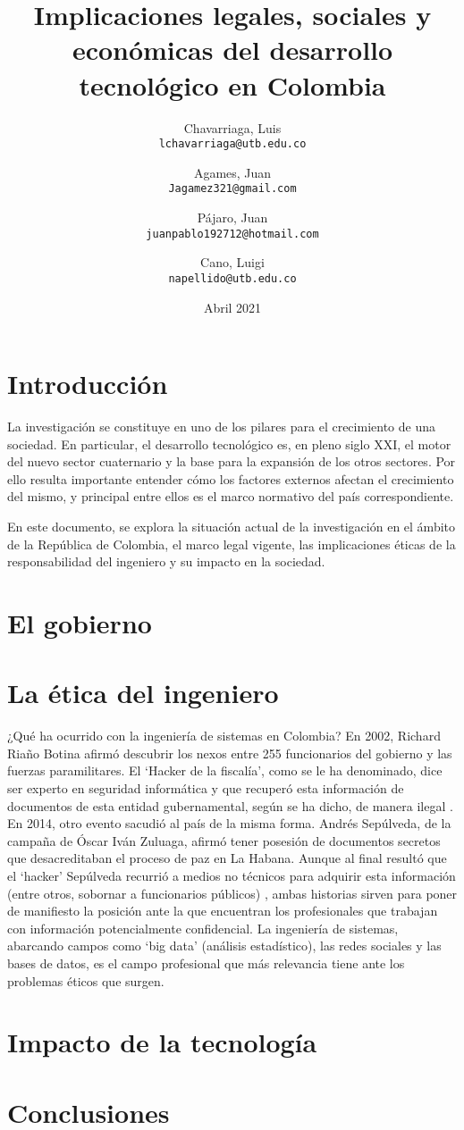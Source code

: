 \documentclass[twocolumn]{article}
\author{
  Chavarriaga, Luis\\
  \texttt{lchavarriaga@utb.edu.co}
  \and
  Agames, Juan\\
  \texttt{Jagamez321@gmail.com}
  \and
  Pájaro, Juan\\
  \texttt{juanpablo192712@hotmail.com}
  \and
  Cano, Luigi\\
  \texttt{napellido@utb.edu.co}
}
\title{Implicaciones legales, sociales y económicas del desarrollo tecnológico
  en Colombia}
\date{Abril 2021}
\begin{document}
\maketitle

\section{Introducción}
La investigación se constituye en uno de los pilares para el crecimiento de una
sociedad. En particular, el desarrollo tecnológico es, en pleno siglo XXI, el
motor del nuevo sector cuaternario y la base para la expansión de los otros
sectores. Por ello resulta importante entender cómo los factores externos
afectan el crecimiento del mismo, y principal entre ellos es el marco normativo
del país correspondiente.

En este documento, se explora la situación actual de la investigación en el
ámbito de la República de Colombia, el marco legal vigente, las implicaciones
éticas de la responsabilidad del ingeniero y su impacto en la sociedad.

\section{El gobierno}

\section{La ética del ingeniero}

¿Qué ha ocurrido con la ingeniería de sistemas en Colombia? En 2002, Richard
Riaño Botina afirmó descubrir los nexos entre 255 funcionarios del gobierno y
las fuerzas paramilitares. El `Hacker de la fiscalía', como se le ha denominado,
dice ser experto en seguridad informática y que recuperó esta información de
documentos de esta entidad gubernamental, según se ha dicho, de manera ilegal
\cite{noauthor_quien_2020}. En 2014, otro evento sacudió al país de la misma
forma. Andrés Sepúlveda, de la campaña de Óscar Iván Zuluaga, afirmó tener
posesión de documentos secretos que desacreditaban el proceso de paz en La
Habana. Aunque al final resultó que el `hacker' Sepúlveda recurrió a medios no
técnicos para adquirir esta información (entre otros, sobornar a funcionarios
públicos) \cite{semanacom_andres_nodate}, ambas historias sirven para poner de
manifiesto la posición ante la que encuentran los profesionales que trabajan con
información potencialmente confidencial. La ingeniería de sistemas, abarcando
campos como `big data' (análisis estadístico), las redes sociales y las bases de
datos, es el campo profesional que más relevancia tiene ante los problemas
éticos que surgen.




\section{Impacto de la tecnología}

\section{Conclusiones}

\printbibliography{}
\end{document}
